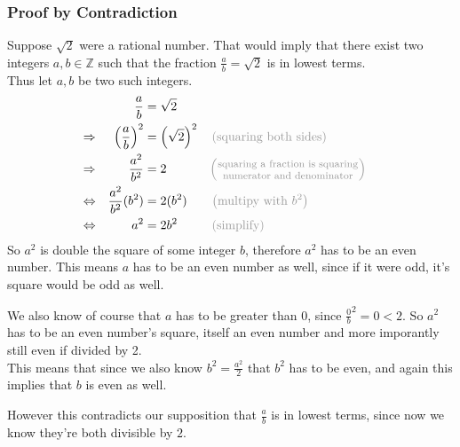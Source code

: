 \documentclass{article}
\newcommand{\mexpl}[1]{\color{gray_custom}\left(\text{#1}\right)}
\newcommand{\mexplbig}[1]{
                \color{gray_custom}{\left(\parbox{4cm}{ \centering \footnotesize #1 }\right)}
            }
\begin{document}
    \subsubsection*{Proof by Contradiction}
    Suppose $\sqrt{2}$ were a rational number. 
    That would imply that there exist two integers $a,b\in\mathbb{Z}$ 
    such that the fraction $\frac{a}{b} = \sqrt{2}$ is in lowest terms. \\
    Thus let $a,b$ be two such integers. 
    \begin{align*}
        &&       
            \frac{a}{b}                     &=          \sqrt{2}
                                                                                        \\
        \Rightarrow&&       
            \left(\frac{a}{b}\right)^2      &=          \left(\sqrt{2}\right)^2
            &&\mexpl{squaring both sides}
                                                                                        \\
        \Rightarrow&&       
            \frac{a^2}{b^2}                 &=          2
            &&\mexplbig{
                squaring a fraction is squaring numerator and denominator
            }
                                                                                        \\
        \Leftrightarrow&&       
            \frac{a^2}{b^2}(b^2)            &=          2(b^2)
            &&\mexpl{multipy with $b^2$}
                                                                                        \\
        \Leftrightarrow&&       
            a^2                             &=          2b^2
            &&\mexpl{simplify}
    \end{align*}
    So $a^2$ is double the square of some integer $b$, therefore $a^2$ has to be an even 
    number. 
    This means $a$ has to be an even number as well, since if it were odd, it's square 
    would be odd as well.

    We also know of course that $a$ has to be greater than $0$, since 
    $\frac{0}{b}^2 = 0 < 2$. 
    So $a^2$ has to be an even number's square, itself an even number and more imporantly 
    still even if divided by 2. \\
    This means that since we also know $b^2 = \frac{a^2}{2}$ that $b^2$ has to be even, 
    and again this implies that $b$ is even as well. 

    However this contradicts our supposition that $\frac{a}{b}$ is in lowest terms, since 
    now we know they're both divisible by $2$. 
\end{document}
